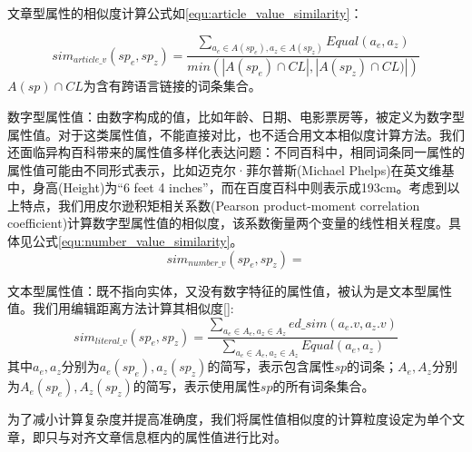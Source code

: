 文章型属性的相似度计算公式如\ref{equ:article_value_similarity}：

\begin{equation}
\label{equ:article_value_similarity}
sim_{article\_v}(sp_e, sp_z) = \frac{\sum_{a_e\in A(sp_e), a_z \in A(sp_z)} Equal(a_e, a_z)}{min(\left| A(sp_e)\cap CL \right|, \left|A(sp_z) \cap CL) \right|)}
\end{equation}
$A(sp)\cap CL$为含有跨语言链接的词条集合。

数字型属性值：由数字构成的值，比如年龄、日期、电影票房等，被定义为数字型属性值。对于这类属性值，不能直接对比，也不适合用文本相似度计算方法。我们还面临异构百科带来的属性值多样化表达问题：不同百科中，相同词条同一属性的属性值可能由不同形式表示，比如迈克尔·菲尔普斯(Michael Phelps)在英文维基中，身高(Height)为“6 feet 4 inches”，而在百度百科中则表示成193cm。考虑到以上特点，我们用皮尔逊积矩相关系数(Pearson product-moment correlation coefficient)计算数字型属性值的相似度，该系数衡量两个变量的线性相关程度。具体见公式\ref{equ:number_value_similarity}。
\begin{equation}
\label{equ:number_value_similarity}
sim_{number\_v}(sp_e, sp_z) =
\end{equation}

文本型属性值：既不指向实体，又没有数字特征的属性值，被认为是文本型属性值。我们用编辑距离方法计算其相似度\ref{}:
\begin{equation}
\label{equ:literal_value_similarity}
sim_{literal\_v}(sp_e, sp_z) = \frac { \sum _{ { a }_{ e }\in { A }_{ e },{ a }_{ z }\in { A }_{ z } }{ ed\_ sim\left( { a }_{ e }.v,{ a }_{ z }.v \right)  }  }{ \sum _{ { a }_{ e }\in { A }_{ e },{ a }_{ z }\in { A }_{ z } }{ Equal\left( { a }_{ e },{ a }_{ z } \right)  }  }
\end{equation}
其中$a_e, a_z$分别为$a_e(sp_e), a_z(sp_z)$的简写，表示包含属性$sp$的词条；$A_e, A_z$分别为$A_e(sp_e),A_z(sp_z)$的简写，表示使用属性$sp$的所有词条集合。

为了减小计算复杂度并提高准确度，我们将属性值相似度的计算粒度设定为单个文章，即只与对齐文章信息框内的属性值进行比对。

